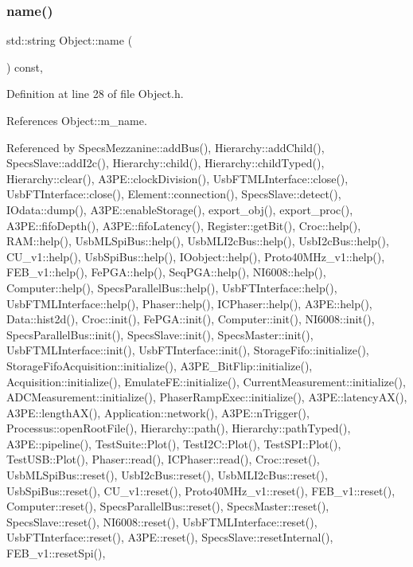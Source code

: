 \subsubsection{\texorpdfstring{name()}{name()}}
{\footnotesize\ttfamily std\+::string Object\+::name (\begin{DoxyParamCaption}{ }\end{DoxyParamCaption}) const\hspace{0.3cm}{\ttfamily [inline]}, {\ttfamily [inherited]}}



Definition at line 28 of file Object.\+h.



References Object\+::m\+\_\+name.



Referenced by Specs\+Mezzanine\+::add\+Bus(), Hierarchy\+::add\+Child(), Specs\+Slave\+::add\+I2c(), Hierarchy\+::child(), Hierarchy\+::child\+Typed(), Hierarchy\+::clear(), A3\+P\+E\+::clock\+Division(), Usb\+F\+T\+M\+L\+Interface\+::close(), Usb\+F\+T\+Interface\+::close(), Element\+::connection(), Specs\+Slave\+::detect(), I\+Odata\+::dump(), A3\+P\+E\+::enable\+Storage(), export\+\_\+obj(), export\+\_\+proc(), A3\+P\+E\+::fifo\+Depth(), A3\+P\+E\+::fifo\+Latency(), Register\+::get\+Bit(), Croc\+::help(), R\+A\+M\+::help(), Usb\+M\+L\+Spi\+Bus\+::help(), Usb\+M\+L\+I2c\+Bus\+::help(), Usb\+I2c\+Bus\+::help(), C\+U\+\_\+v1\+::help(), Usb\+Spi\+Bus\+::help(), I\+Oobject\+::help(), Proto40\+M\+Hz\+\_\+v1\+::help(), F\+E\+B\+\_\+v1\+::help(), Fe\+P\+G\+A\+::help(), Seq\+P\+G\+A\+::help(), N\+I6008\+::help(), Computer\+::help(), Specs\+Parallel\+Bus\+::help(), Usb\+F\+T\+Interface\+::help(), Usb\+F\+T\+M\+L\+Interface\+::help(), Phaser\+::help(), I\+C\+Phaser\+::help(), A3\+P\+E\+::help(), Data\+::hist2d(), Croc\+::init(), Fe\+P\+G\+A\+::init(), Computer\+::init(), N\+I6008\+::init(), Specs\+Parallel\+Bus\+::init(), Specs\+Slave\+::init(), Specs\+Master\+::init(), Usb\+F\+T\+M\+L\+Interface\+::init(), Usb\+F\+T\+Interface\+::init(), Storage\+Fifo\+::initialize(), Storage\+Fifo\+Acquisition\+::initialize(), A3\+P\+E\+\_\+\+Bit\+Flip\+::initialize(), Acquisition\+::initialize(), Emulate\+F\+E\+::initialize(), Current\+Measurement\+::initialize(), A\+D\+C\+Measurement\+::initialize(), Phaser\+Ramp\+Exec\+::initialize(), A3\+P\+E\+::latency\+A\+X(), A3\+P\+E\+::length\+A\+X(), Application\+::network(), A3\+P\+E\+::n\+Trigger(), Processus\+::open\+Root\+File(), Hierarchy\+::path(), Hierarchy\+::path\+Typed(), A3\+P\+E\+::pipeline(), Test\+Suite\+::\+Plot(), Test\+I2\+C\+::\+Plot(), Test\+S\+P\+I\+::\+Plot(), Test\+U\+S\+B\+::\+Plot(), Phaser\+::read(), I\+C\+Phaser\+::read(), Croc\+::reset(), Usb\+M\+L\+Spi\+Bus\+::reset(), Usb\+I2c\+Bus\+::reset(), Usb\+M\+L\+I2c\+Bus\+::reset(), Usb\+Spi\+Bus\+::reset(), C\+U\+\_\+v1\+::reset(), Proto40\+M\+Hz\+\_\+v1\+::reset(), F\+E\+B\+\_\+v1\+::reset(), Computer\+::reset(), Specs\+Parallel\+Bus\+::reset(), Specs\+Master\+::reset(), Specs\+Slave\+::reset(), N\+I6008\+::reset(), Usb\+F\+T\+M\+L\+Interface\+::reset(), Usb\+F\+T\+Interface\+::reset(), A3\+P\+E\+::reset(), Specs\+Slave\+::reset\+Internal(), F\+E\+B\+\_\+v1\+::reset\+Spi(), 